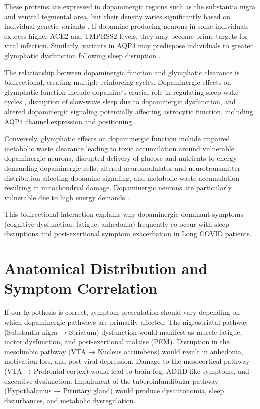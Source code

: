 \documentclass[12pt]{article}
\begin{document}
These proteins are expressed in dopaminergic regions such as the substantia nigra and ventral tegmental area, but their density varies significantly based on individual genetic variants \citep{Song2021, Douaud2022}. If dopamine-producing neurons in some individuals express higher ACE2 and TMPRSS2 levels, they may become prime targets for viral infection. Similarly, variants in AQP4 may predispose individuals to greater glymphatic dysfunction following sleep disruption \citep{Boespflug2018}.

The relationship between dopaminergic function and glymphatic clearance is bidirectional, creating multiple reinforcing cycles. Dopaminergic effects on glymphatic function include dopamine's crucial role in regulating sleep-wake cycles \citep{Dzirasa2006}, disruption of slow-wave sleep due to dopaminergic dysfunction, and altered dopaminergic signaling potentially affecting astrocytic function, including AQP4 channel expression and positioning \citep{DiCastro2018}.

Conversely, glymphatic effects on dopaminergic function include impaired metabolic waste clearance leading to toxic accumulation around vulnerable dopaminergic neurons, disrupted delivery of glucose and nutrients to energy-demanding dopaminergic cells, altered neuromodulator and neurotransmitter distribution affecting dopamine signaling, and metabolic waste accumulation resulting in mitochondrial damage. Dopaminergic neurons are particularly vulnerable due to high energy demands \citep{Stefano2021}.

This bidirectional interaction explains why dopaminergic-dominant symptoms (cognitive dysfunction, fatigue, anhedonia) frequently co-occur with sleep disruptions and post-exertional symptom exacerbation in Long COVID patients.

\section{Anatomical Distribution and Symptom Correlation}

If our hypothesis is correct, symptom presentation should vary depending on which dopaminergic pathways are primarily affected. The nigrostriatal pathway (Substantia nigra → Striatum) dysfunction would manifest as muscle fatigue, motor dysfunction, and post-exertional malaise (PEM). Disruption in the mesolimbic pathway (VTA → Nucleus accumbens) would result in anhedonia, motivation loss, and post-viral depression. Damage to the mesocortical pathway (VTA → Prefrontal cortex) would lead to brain fog, ADHD-like symptoms, and executive dysfunction. Impairment of the tuberoinfundibular pathway (Hypothalamus → Pituitary gland) would produce dysautonomia, sleep disturbances, and metabolic dysregulation.
\end{document}
